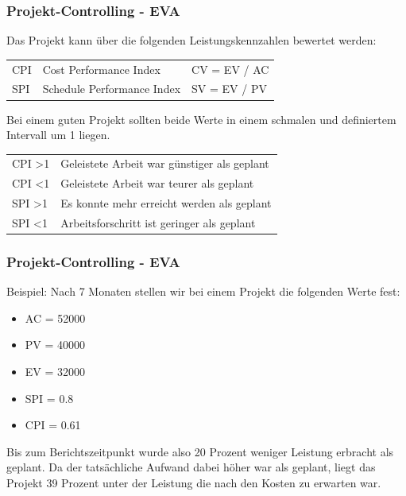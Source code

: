 \begin{frame}
\frametitle{Projekt-Controlling - EVA}
	Das Projekt kann über die folgenden Leistungskennzahlen bewertet werden:
	\scriptsize
	\begin{table}[]
		\begin{tabular}{lll}
		 CPI & Cost Performance Index & CV = EV / AC \\
		 SPI & Schedule Performance Index & SV = EV / PV \\
		\end{tabular}
	\end{table}
	\normalsize
	Bei einem guten Projekt sollten beide Werte in einem schmalen und
	definiertem Intervall um 1 liegen.
	\begin{table}[]
		\begin{tabular}{ll}
		 \cellcolor[HTML]{9FD477} CPI \textgreater 1 & \cellcolor[HTML]{9FD477} Geleistete Arbeit war günstiger als geplant \\
		 \cellcolor[HTML]{FC6D58} CPI \textless 1 & \cellcolor[HTML]{FC6D58} Geleistete Arbeit war teurer als geplant \\
		 \cellcolor[HTML]{9FD477} SPI \textgreater 1 & \cellcolor[HTML]{9FD477} Es konnte mehr erreicht werden als geplant \\
		 \cellcolor[HTML]{FC6D58} SPI \textless 1 & \cellcolor[HTML]{FC6D58} Arbeitsforschritt ist geringer als geplant \\
		\end{tabular}
	\end{table}
\end{frame}

\begin{frame}
\frametitle{Projekt-Controlling - EVA}
	Beispiel: Nach 7 Monaten stellen wir bei einem Projekt die folgenden Werte fest:
	\begin{itemize}
		\item AC = 52000
		\item PV = 40000
		\item EV = 32000
		\item SPI = 0.8
		\item CPI = 0.61
	\end{itemize}
	Bis zum Berichtszeitpunkt wurde also 20 Prozent weniger Leistung erbracht als geplant.
	Da der tatsächliche Aufwand dabei höher war als geplant, liegt das Projekt 39 Prozent
	unter der Leistung die nach den Kosten zu erwarten war.
	\normalsize
\end{frame}

